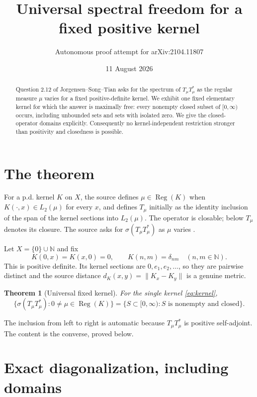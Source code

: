 \documentclass[11pt]{article}
\title{Universal spectral freedom for a fixed positive kernel}
\author{Autonomous proof attempt for arXiv:2104.11807}
\date{11 August 2026}
\newtheorem{theorem}{Theorem}
\newcommand{\N}{\mathbb N}
\newcommand{\Reg}{\operatorname{Reg}}
\begin{document}
\maketitle

\begin{abstract}
Question 2.12 of Jorgensen--Song--Tian asks for the spectrum of
$T_\mu T_\mu^*$ as the regular measure $\mu$ varies for a fixed
positive-definite kernel.  We exhibit one fixed elementary kernel for which
the answer is maximally free: every nonempty closed subset of $[0,\infty)$
occurs, including unbounded sets and sets with isolated zero.  We give the
closed-operator domains explicitly.  Consequently no kernel-independent
restriction stronger than positivity and closedness is possible.
\end{abstract}

\section{The theorem}

For a p.d. kernel $K$ on $X$, the source defines $\mu\in\Reg(K)$ when
$K(\cdot,x)\in L_2(\mu)$ for every $x$, and defines $T_\mu$ initially as
the identity inclusion of the span of the kernel sections into $L_2(\mu)$.
The operator is closable; below $T_\mu$ denotes its closure.  The source asks
for $\sigma(T_\mu T_\mu^*)$ as $\mu$ varies \cite[Question 2.12]{JST}.

Let $X=\{0\}\cup\N$ and fix
\begin{equation}\label{eq:kernel}
 K(0,x)=K(x,0)=0,\qquad K(n,m)=\delta_{nm}\quad(n,m\in\N).
\end{equation}
This is positive definite.  Its kernel sections are $0,e_1,e_2,\ldots$,
so they are pairwise distinct and the source distance
$d_K(x,y)=\|K_x-K_y\|$ is a genuine metric.

\begin{theorem}[Universal fixed kernel]\label{thm:main}
For the single kernel \eqref{eq:kernel},
\[
 \bigl\{\sigma(T_\mu T_\mu^*):0\ne\mu\in\Reg(K)\bigr\}
 =\bigl\{S\subset[0,\infty):S\text{ is nonempty and closed}\bigr\}.
\]
\end{theorem}

The inclusion from left to right is automatic because $T_\mu T_\mu^*$ is
positive self-adjoint.  The content is the converse, proved below.

\section{Exact diagonalization, including domains}
\end{document}
